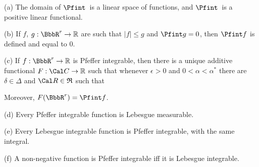  (a) The domain of $\Pfint\,$ is a linear
space of functions, and $\Pfint\,$ is a positive linear functional.

(b) If $f$, $g:\BbbR^r\to\Bbb R$ are such that $|f|\le g$ and
$\Pfint g=0$, then $\Pfint f$ is defined and equal to $0$.

(c) If $f:\BbbR^r\to\Bbb R$ is Pfeffer
integrable, then there is a unique additive functional
$F:\Cal C\to\Bbb R$ such that whenever $\epsilon>0$ and
$0<\alpha<\alpha^*$ there are
$\delta\in\Delta$ and $\Cal R\in\frak R$ such that



\noindent Moreover, $F(\BbbR^r)=\Pfint f$.

(d) Every Pfeffer integrable function is Lebesgue measurable.

(e) Every Lebesgue integrable function is Pfeffer integrable, with the
same integral.

(f) A non-negative function is Pfeffer integrable iff it is Lebesgue
integrable.


